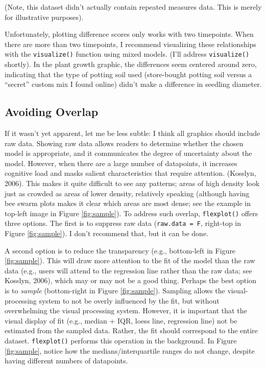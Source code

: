 \documentclass[
  doc]{apa6}
\begin{document}
\noindent (Note, this dataset didn't actually contain repeated measures data. This is merely for illustrative purposes).

Unfortunately, plotting difference scores only works with two timepoints. When there are more than two timepoints, I recommend visualizing these relationships with the \texttt{visualize()} function using mixed models. (I'll address \texttt{visualize()} shortly). In the plant growth graphic, the differences seem centered around zero, indicating that the type of potting soil used (store-bought potting soil versus a \enquote{secret} custom mix I found online) didn't make a difference in seedling diameter.

\hypertarget{avoiding-overlap}{%
\subsection{Avoiding Overlap}\label{avoiding-overlap}}

If it wasn't yet apparent, let me be less subtle: I think all graphics should include raw data. Showing raw data allows readers to determine whether the chosen model is appropriate, and it communicates the degree of uncertainty about the model. However, when there are a large number of datapoints, it increases cognitive load and masks salient characteristics that require attention. (Kosslyn, 2006). This makes it quite difficult to see any patterns; areas of high density look just as crowded as areas of lower density, relatively speaking (although having bee swarm plots makes it clear which areas are most dense; see the example in top-left image in Figure \ref{fig:sample}). To address such overlap, \texttt{flexplot()} offers three options. The first is to suppress raw data (\texttt{raw.data\ =\ F}, right-top in Figure \ref{fig:sample}). I don't recommend that, but it can be done.

A second option is to reduce the transparency (e.g., bottom-left in Figure \ref{fig:sample}). This will draw more attention to the fit of the model than the raw data (e.g., users will attend to the regression line rather than the raw data; see Kosslyn, 2006), which may or may not be a good thing. Perhaps the best option is to \emph{sample} (bottom-right in Figure \ref{fig:sample}). Sampling allows the visual-processing system to not be overly influenced by the fit, but without overwhelming the visual processing system. However, it is important that the visual display of fit (e.g., median + IQR, loess line, regression line) not be estimated from the sampled data. Rather, the fit should correspond to the entire dataset. \texttt{flexplot()} performs this operation in the background. In Figure \ref{fig:sample}, notice how the medians/interquartile ranges do not change, despite having different numbers of datapoints.
\end{document}
